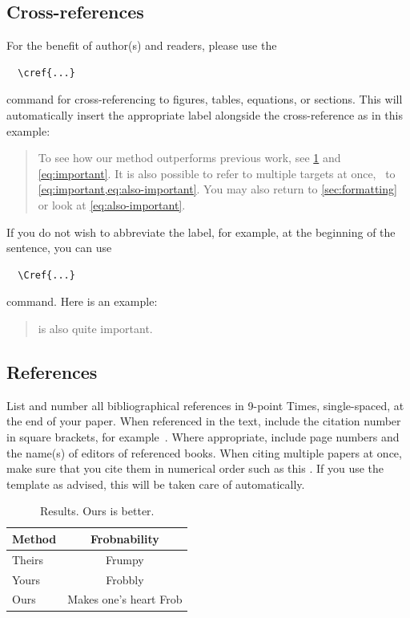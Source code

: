 \documentclass[10pt,twocolumn,letterpaper]{article}
\begin{document}
\subsection{Cross-references}

For the benefit of author(s) and readers, please use the
{\small\begin{verbatim}
  \cref{...}
\end{verbatim}}  command for cross-referencing to figures, tables, equations, or sections.
This will automatically insert the appropriate label alongside the cross-reference as in this example:
\begin{quotation}
  To see how our method outperforms previous work, see \cref{tab:example} and \cref{eq:important}.
  It is also possible to refer to multiple targets at once, \eg~to \cref{eq:important,eq:also-important}.
  You may also return to \cref{sec:formatting} or look at \cref{eq:also-important}.
\end{quotation}
If you do not wish to abbreviate the label, for example, at the beginning of the sentence, you can use
{\small\begin{verbatim}
  \Cref{...}
\end{verbatim}}
command. Here is an example:
\begin{quotation}
   is also quite important.
\end{quotation}

\subsection{References}

List and number all bibliographical references in 9-point Times, single-spaced, at the end of your paper.
When referenced in the text, include the citation number in square brackets, for
example~\cite{Authors14}.
Where appropriate, include page numbers and the name(s) of editors of referenced books.
When citing multiple papers at once, make sure that you cite them in numerical order such as this \cite{Alpher02,Alpher03,Alpher05,Authors14b,Authors14}.
If you use the template as advised, this will be taken care of automatically.

\begin{table}
  \caption{Results.   Ours is better.}
  \label{tab:example}
  \centering
  \begin{tabular}{@{}lc@{}}
    \toprule
    Method & Frobnability \\
    \midrule
    Theirs & Frumpy \\
    Yours & Frobbly \\
    Ours & Makes one's heart Frob\\
    \bottomrule
  \end{tabular}
\end{table}
\end{document}

